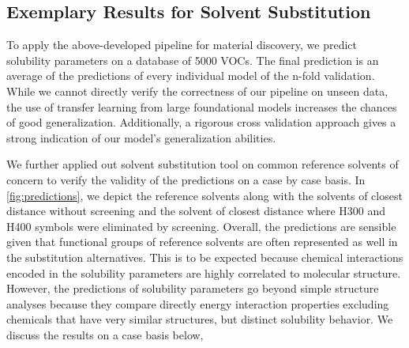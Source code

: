 \documentclass[
  english,        %
  font=times,     %
  onecolumn,      %
]{article}
\begin{document}
\subsection*{Exemplary Results for Solvent Substitution}
To apply the above-developed pipeline for material discovery, we predict solubility parameters on a database of 5000 VOCs\cite{CompsolDatabaseRevised2024}. The final prediction is an average of the predictions of every individual model of the n-fold validation.
While we cannot directly verify the correctness of our pipeline on unseen data, the use of transfer learning from large foundational models increases the chances of good generalization. Additionally,  a rigorous cross validation approach gives a strong indication of our model's generalization abilities.


We further applied out solvent substitution tool on common reference solvents of concern to verify the validity of the predictions on a case by case basis. In \cref{fig:predictions}, we depict the reference solvents along with the solvents of closest distance without screening and the solvent of closest distance where H300 and H400 symbols were eliminated by screening.  Overall, the predictions are sensible given that functional groups of reference solvents are often represented as well in the substitution alternatives.
This is to be expected because chemical interactions encoded in the solubility parameters are highly correlated to molecular structure. However, the predictions of solubility parameters go beyond simple structure analyses because they compare directly energy interaction properties excluding chemicals that have very similar structures, but distinct solubility behavior. We discuss the results on a case basis below,
\end{document}
